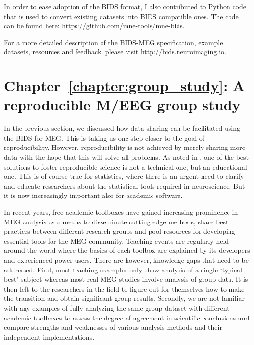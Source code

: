 In order to ease adoption of the BIDS format, I also contributed to Python code that is used to convert existing datasets into BIDS compatible ones. The code can be found here: \url{https://github.com/mne-tools/mne-bids}. 

For a more detailed description of the BIDS-MEG specification, example datasets, resources and feedback, please visit \url{http://bids.neuroimaging.io}.

\section*{Chapter~\ref{chapter:group_study}: A reproducible M/EEG group study}

In the previous section, we discussed how data sharing can be facilitated using the \ac{BIDS} for \ac{MEG}. This is taking us one step closer to the goal of reproducibility. However, reproducibility is not achieved by merely sharing more data with the hope that this will solve all problems. As noted in \citet{baker20161}, one of the best solutions to foster reproducible science is not a technical one, but an educational one. This is of course true for statistics, where there is an urgent need to clarify and educate researchers about the statistical tools required in neuroscience. But it is now increasingly important also for academic software.

In recent years, free academic toolboxes have gained increasing prominence in \ac{MEG} analysis as a means to disseminate cutting edge methods, share best practices between different research groups and pool resources for developing essential tools for the \ac{MEG} community. Teaching events are regularly held around the world where the basics of each toolbox are explained by its  developers and experienced power users. There are however, knowledge gaps that need to be addressed. First, most teaching examples only show analysis of a single ‘typical best’ subject whereas most real MEG studies involve analysis of group data. It is then left to the researchers in the field to figure out for themselves how to make the transition and obtain significant group results. Secondly, we are not familiar with any examples of fully analyzing the same group dataset with different academic toolboxes to assess the degree of agreement in scientific conclusions and compare strengths and weaknesses of various analysis methods and their independent implementations.

